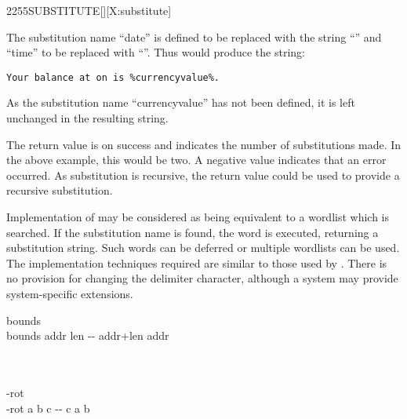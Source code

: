 \begin{worddef}{2255}{SUBSTITUTE}[][X:substitute]
\begin{rationale}
		The substitution name ``date'' is defined to be replaced with the string
		``\pdate'' and ``time'' to be replaced with ``\ptime''.  Thus
		 would produce the string:

		\begin{center}
			\texttt{Your balance at \ptime{} on \pdate{} is \%currencyvalue\%.}
		\end{center}

		As the substitution name ``currencyvalue'' has not been defined, it is
		left unchanged in the resulting string.

		The return value  is
		on success
		and indicates the number of substitutions made.  In the above example,
		this would be two.  A negative value indicates that an error occurred.
		As substitution is  recursive, the return value could be used to
		provide a recursive substitution.

		Implementation of  may be considered as being equivalent
		to a wordlist which is searched.  If the substitution name is found, the
		word is executed, returning a substitution string.
		Such words can be deferred or multiple wordlists can be used.
		The implementation techniques required are similar to those used by
		.
		There is no provision for changing the delimiter character, although a
		system may provide system-specific extensions.
	\end{rationale}

	\begin{implement}

		\word[tools]{[UNDEFINED]} bounds \word[tools]{[IF]} \\
		\tab \word{:} bounds \tab {} addr len -{}- addr+len addr \\
		\tab[2]  \word{+} \\
		\tab \word{;} \\
		\word[tools]{[THEN]}

		\word[tools]{[UNDEFINED]} -rot \word[tools]{[IF]} \\
		\tab \word{:} -rot \tab {} a b c -{}- c a b \\
		\tab[2] \word{ROT}  \\
		\tab \word{;} \\
		\word[tools]{[THEN]}


\end{implement}
\end{worddef}
